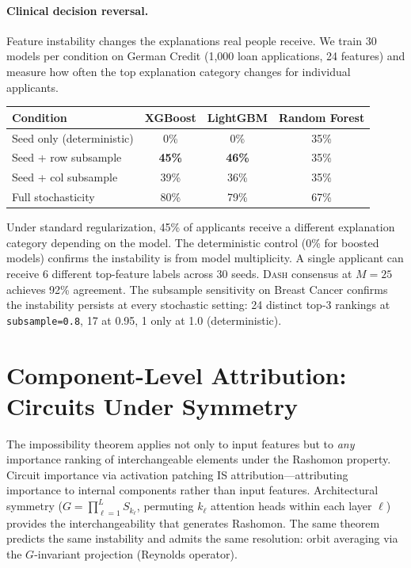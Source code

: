 \documentclass{jmlr}
\newcommand{\DASH}{\textsc{Dash}}
\begin{document}
\paragraph{Clinical decision reversal.}
Feature instability changes the explanations real people receive. We train 30 models per condition on German Credit (1,000 loan applications, 24 features) and measure how often the top explanation category changes for individual applicants.

\begin{center}
\small
\begin{tabular}{@{}lccc@{}}
\toprule
Condition & XGBoost & LightGBM & Random Forest \\
\midrule
Seed only (deterministic) & 0\% & 0\% & 35\% \\
Seed + row subsample & \textbf{45\%} & \textbf{46\%} & 35\% \\
Seed + col subsample & 39\% & 36\% & 35\% \\
Full stochasticity & 80\% & 79\% & 67\% \\
\bottomrule
\end{tabular}
\end{center}

Under standard regularization, 45\% of applicants receive a different explanation category depending on the model. The deterministic control (0\% for boosted models) confirms the instability is from model multiplicity. A single applicant can receive 6 different top-feature labels across 30 seeds. \DASH{} consensus at $M = 25$ achieves 92\% agreement. The subsample sensitivity on Breast Cancer confirms the instability persists at every stochastic setting: 24 distinct top-3 rankings at \texttt{subsample=0.8}, 17 at 0.95, 1 only at 1.0 (deterministic).


\section{Component-Level Attribution: Circuits Under Symmetry}
\label{sec:component-level}

The impossibility theorem applies not only to input features but to \emph{any} importance ranking of interchangeable elements under the Rashomon property. Circuit importance via activation patching IS attribution---attributing importance to internal components rather than input features. Architectural symmetry ($G = \prod_{\ell=1}^{L} S_{k_\ell}$, permuting $k_\ell$ attention heads within each layer $\ell$) provides the interchangeability that generates Rashomon. The same theorem predicts the same instability and admits the same resolution: orbit averaging via the $G$-invariant projection (Reynolds operator).
\end{document}
